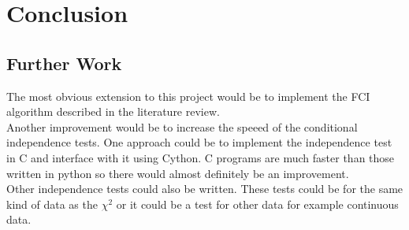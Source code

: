 \documentclass{article}
\begin{document}
\section{Conclusion}
\subsection{Further Work}
The most obvious extension to this project would be to implement the FCI algorithm described in the literature review.\\

Another improvement would be to increase the speeed of the conditional independence tests. One approach could be to implement the independence test in C and interface with it using Cython. C programs are much faster than those written in python so there would almost definitely be an improvement.\\

Other independence tests could also be written. These tests could be for the same kind of data as the $\chi^2$ or it could be a test for other data for example continuous data.\\
\end{document}
